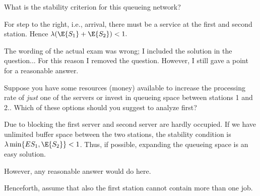 \begin{exercise}[201706]
What is the stability criterion for  this queueing network?
\begin{solution}
For step to the right, i.e., arrival, there must be a service at the first and second station. Hence $\lambda (\E{S_1} + \E{S_2} )  < 1.$ 

The wording of the actual exam was wrong; I included the solution in the question... For this reason I removed the question. However, I still gave a point for a reasonable answer. 
\end{solution}
\end{exercise}


\begin{exercise}[201706]
Suppose you have some resources (money) available to increase the processing rate of \emph{just} one of the servers or invest in queueing space between stations 1 and 2.. Which of these options should you suggest to analyze first? 
\begin{solution}
Due to blocking the first server and second server are hardly occupied. 
If  we have unlimited buffer space between the two stations, the stability condition is 
$\lambda\min\{E{S_1}, \E{S_2}\}<1$.   
Thus, if possible, expanding the queueing space is an easy solution.

However, any reasonable answer would do here.
\end{solution}
\end{exercise}


Henceforth, assume that also the first station cannot contain more than one job. 

